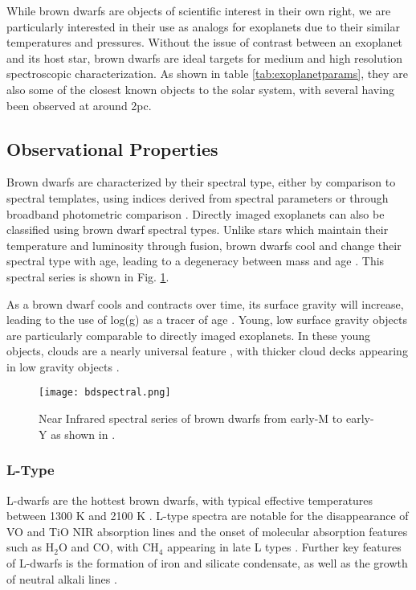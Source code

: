 While brown dwarfs are objects of scientific interest in their own right, we are particularly interested in their use as analogs for exoplanets due to their similar temperatures and pressures.
Without the issue of contrast between an exoplanet and its host star, brown dwarfs are ideal targets for medium and high resolution spectroscopic characterization.
As shown in table \ref{tab:exoplanetparams}, they are also some of the closest known objects to the solar system, with several having been observed at around 2pc.

\subsection{Observational Properties}
Brown dwarfs are characterized by their spectral type, either by comparison to spectral templates, using indices derived from spectral parameters or through broadband photometric comparison \parencite{Helling2014}.
Directly imaged exoplanets can also be classified using brown dwarf spectral types.
Unlike stars which maintain their temperature and luminosity through fusion, brown dwarfs cool and change their spectral type with age, leading to a degeneracy between mass and age \parencite{Burrows2001}.
This spectral series is shown in Fig. \ref{fig:bdspec}.

As a brown dwarf cools and contracts over time, its surface gravity will increase, leading to the use of log(g) as a tracer of age \parencite{Manjavacas2014}.
Young, low surface gravity objects are particularly comparable to directly imaged exoplanets.
In these young objects, clouds are a nearly universal feature \parencite{Cooper2003,Helling2014}, with thicker cloud decks appearing in low gravity objects \parencite{Helling2014}.

\begin{figure}[t]
	\texttt{[image: bdspectral.png]}
	\caption[Brown Dwarf Spectra]{Near Infrared spectral series of brown dwarfs from early-M to early-Y as shown in \parencite{Helling2014}.}
	\label{fig:bdspec}
\end{figure}

\subsubsection{L-Type}
L-dwarfs are the hottest brown dwarfs, with typical effective temperatures between 1300 K and 2100 K \parencite{Burrows2001}.
L-type spectra are notable for the disappearance of VO and TiO NIR absorption lines and the onset of molecular absorption features such as H$_{2}$O and CO, with CH$_{4}$ appearing in late L types \parencite{Manjavacas2014}.
Further key features of L-dwarfs is the formation of iron and silicate condensate, as well as the growth of neutral alkali lines \parencite{Burrows2001}.
